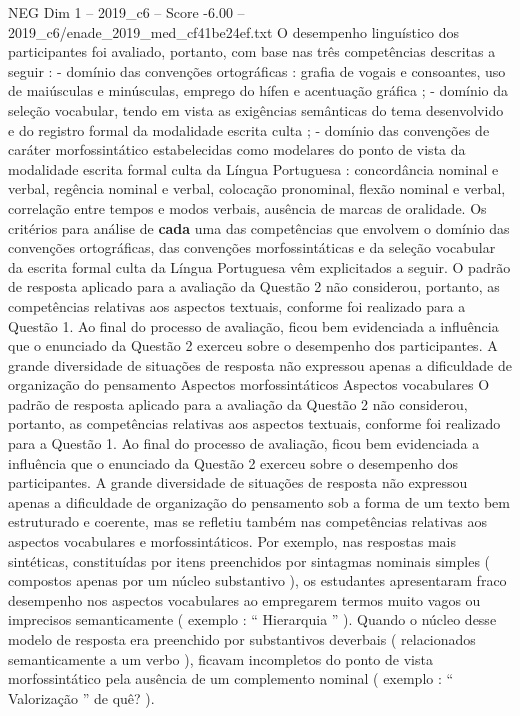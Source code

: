 \begin{textsample}{NEG Dim 1 – 2019\_c6 – Score -6.00 – 2019\_c6/enade\_2019\_med\_cf41be24ef.txt}
O desempenho linguístico dos participantes foi avaliado, portanto, com base nas três competências descritas a seguir : - domínio das convenções ortográficas : grafia de vogais e consoantes, uso de maiúsculas e minúsculas, emprego do hífen e acentuação gráfica ; - domínio da seleção vocabular, tendo em vista as exigências semânticas do tema desenvolvido e do registro formal da modalidade escrita culta ; - domínio das convenções de caráter morfossintático estabelecidas como modelares do ponto de vista da modalidade escrita formal culta da Língua Portuguesa : concordância nominal e verbal, regência nominal e verbal, colocação pronominal, flexão nominal e verbal, correlação entre tempos e modos verbais, ausência de marcas de oralidade.
Os critérios para análise de \textbf{cada} uma das competências que envolvem o domínio das convenções ortográficas, das convenções morfossintáticas e da seleção vocabular da escrita formal culta da Língua Portuguesa vêm explicitados a seguir.
O padrão de resposta aplicado para a avaliação da Questão 2 não considerou, portanto, as competências relativas aos aspectos textuais, conforme foi realizado para a Questão 1.
Ao final do processo de avaliação, ficou bem evidenciada a influência que o enunciado da Questão 2 exerceu sobre o desempenho dos participantes.
A grande diversidade de situações de resposta não expressou apenas a dificuldade de organização do pensamento Aspectos morfossintáticos Aspectos vocabulares O padrão de resposta aplicado para a avaliação da Questão 2 não considerou, portanto, as competências relativas aos aspectos textuais, conforme foi realizado para a Questão 1.
Ao final do processo de avaliação, ficou bem evidenciada a influência que o enunciado da Questão 2 exerceu sobre o desempenho dos participantes.
A grande diversidade de situações de resposta não expressou apenas a dificuldade de organização do pensamento sob a forma de um texto bem estruturado e coerente, mas se refletiu também nas competências relativas aos aspectos vocabulares e morfossintáticos.
Por exemplo, nas respostas mais sintéticas, constituídas por itens preenchidos por sintagmas nominais simples ( compostos apenas por um núcleo substantivo ), os estudantes apresentaram fraco desempenho nos aspectos vocabulares ao empregarem termos muito vagos ou imprecisos semanticamente ( exemplo : “ Hierarquia ” ).
Quando o núcleo desse modelo de resposta era preenchido por substantivos deverbais ( relacionados semanticamente a um verbo ), ficavam incompletos do ponto de vista morfossintático pela ausência de um complemento nominal ( exemplo : “ Valorização ” de quê? ).

\end{textsample}
